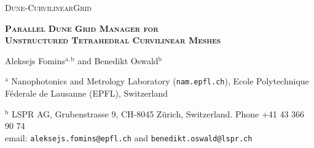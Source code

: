 \documentclass[a4paper,11pt]{article}
\begin{document}
\lstset{language=C++, breaklines=true}







\begin{center}
    
\noindent \textsc{{\Large Dune-CurvilinearGrid}}

\vspace{5mm}

\noindent \textbf{\textsc{{\Large Parallel Dune Grid Manager for\\Unstructured Tetrahedral Curvilinear Meshes}}}
  
\vspace{2mm}
    
{\large
    
\noindent Aleksejs Fomins$^{\mathrm{a,b}}$ and Benedikt Oswald$^{\mathrm{b}}$

  }

\vspace{1mm}

\noindent $^{\mathrm{a}}$ Nanophotonics and Metrology Laboratory (\texttt{nam.epfl.ch}), 
\noindent Ecole Polytechnique F\'ederale de Lausanne (EPFL), Switzerland
  
\vspace{1mm}

\noindent $^{\mathrm{b}}$ LSPR AG, Grubenstrasse 9, CH-8045 Z\"urich, Switzerland.
\noindent Phone +41 43 366 90 74 \\
\noindent
email: \texttt{aleksejs.fomins@epfl.ch} and \texttt{benedikt.oswald@lspr.ch}

\vspace{2mm}

\end{center}
\end{document}
